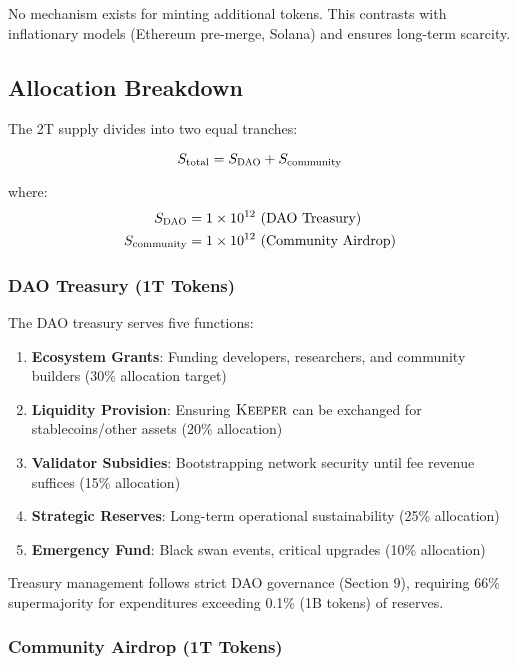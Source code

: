 \documentclass[11pt,letterpaper]{article}
\theoremstyle{definition}
\theoremstyle{remark}
\newcommand{\KEEPER}{\textsc{Keeper}}
\newcommand{\DAO}{\textsc{DAO}}
\begin{document}
No mechanism exists for minting additional tokens. This contrasts with inflationary models (Ethereum pre-merge, Solana) and ensures long-term scarcity.

\subsection{Allocation Breakdown}

The 2T supply divides into two equal tranches:

\begin{equation}
S_{\text{total}} = S_{\DAO} + S_{\text{community}}
\end{equation}

where:
\begin{align}
S_{\DAO} &= 1 \times 10^{12} \text{ (DAO Treasury)} \\
S_{\text{community}} &= 1 \times 10^{12} \text{ (Community Airdrop)}
\end{align}

\subsubsection{DAO Treasury (1T Tokens)}

The DAO treasury serves five functions:

\begin{enumerate}
\item \textbf{Ecosystem Grants}: Funding developers, researchers, and community builders (30\% allocation target)
\item \textbf{Liquidity Provision}: Ensuring $\KEEPER$ can be exchanged for stablecoins/other assets (20\% allocation)
\item \textbf{Validator Subsidies}: Bootstrapping network security until fee revenue suffices (15\% allocation)
\item \textbf{Strategic Reserves}: Long-term operational sustainability (25\% allocation)
\item \textbf{Emergency Fund}: Black swan events, critical upgrades (10\% allocation)
\end{enumerate}

Treasury management follows strict DAO governance (Section 9), requiring 66\% supermajority for expenditures exceeding 0.1\% (1B tokens) of reserves.

\subsubsection{Community Airdrop (1T Tokens)}
\end{document}
